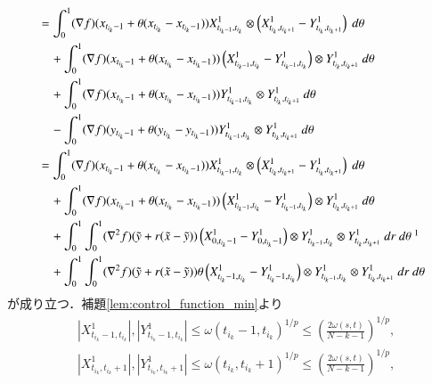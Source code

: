 \begin{prf}
\begin{description}
\begin{align}
					&= \int_0^1 (\nabla f)( x_{t_{i_k}-1}+\theta ( x_{t_{i_k}}-x_{t_{i_k}-1} ))
						X^1_{t_{i_k-1},t_{i_k}} \otimes \left( X^1_{t_{i_k},t_{i_k+1}} - Y^1_{t_{i_k},t_{i_k+1}} \right)\ d\theta \\
						&\quad + \int_0^1 (\nabla f)( x_{t_{i_k}-1}+\theta ( x_{t_{i_k}}-x_{t_{i_k}-1} ))
						\left( X^1_{t_{i_k-1},t_{i_k}} - Y^1_{t_{i_k-1},t_{i_k}} \right) \otimes Y^1_{t_{i_k},t_{i_k+1}}\ d\theta \\
						&\quad + \int_0^1 (\nabla f)( x_{t_{i_k}-1}+\theta ( x_{t_{i_k}}-x_{t_{i_k}-1} ))
						Y^1_{t_{i_k-1},t_{i_k}} \otimes Y^1_{t_{i_k},t_{i_k+1}}\ d\theta \\
						&\quad - \int_0^1 (\nabla f)( y_{t_{i_k}-1}+\theta ( y_{t_{i_k}}-y_{t_{i_k}-1} ))
						Y^1_{t_{i_k-1},t_{i_k}} \otimes Y^1_{t_{i_k},t_{i_k+1}}\ d\theta \\
					&= \int_0^1 (\nabla f)( x_{t_{i_k}-1}+\theta ( x_{t_{i_k}}-x_{t_{i_k}-1} ))
						X^1_{t_{i_k-1},t_{i_k}} \otimes \left( X^1_{t_{i_k},t_{i_k+1}} - Y^1_{t_{i_k},t_{i_k+1}} \right)\ d\theta \\
						&\quad + \int_0^1 (\nabla f)( x_{t_{i_k}-1}+\theta ( x_{t_{i_k}}-x_{t_{i_k}-1} ))
						\left( X^1_{t_{i_k-1},t_{i_k}} - Y^1_{t_{i_k-1},t_{i_k}} \right) \otimes Y^1_{t_{i_k},t_{i_k+1}}\ d\theta \\
						&\quad + \int_0^1 \int_0^1 (\nabla^2 f)( \tilde{y} + r(\tilde{x} - \tilde{y})) 
						\left( X^1_{0,t_{i_k}-1} - Y^1_{0,t_{i_k}-1} \right) \otimes Y^1_{t_{i_k-1},t_{i_k}} \otimes Y^1_{t_{i_k},t_{i_k+1}}\ dr\ d\theta\ \footnotemark \\
						&\quad + \int_0^1 \int_0^1 (\nabla^2 f)( \tilde{y} + r(\tilde{x} - \tilde{y})) 
						\theta \left( X^1_{t_{i_k}-1,t_{i_k}} - Y^1_{t_{i_k}-1,t_{i_k}} \right) \otimes Y^1_{t_{i_k-1},t_{i_k}} \otimes Y^1_{t_{i_k},t_{i_k+1}}\ dr\ d\theta
				\end{align}
				が成り立つ．補題\ref{lem:control_function_min}より
				\begin{align}
					&\left| X^1_{t_{i_k}-1,t_{i_k}} \right|, \left| Y^1_{t_{i_k}-1,t_{i_k}} \right| \leq \omega(t_{i_k}-1,t_{i_k})^{1/p} \leq \left( \frac{2\omega(s,t)}{N-k-1} \right)^{1/p}, \\
					&\left| X^1_{t_{i_k},t_{i_k}+1} \right|, \left| Y^1_{t_{i_k},t_{i_k}+1} \right| \leq \omega(t_{i_k},t_{i_k}+1)^{1/p} \leq \left( \frac{2\omega(s,t)}{N-k-1} \right)^{1/p}, \\

\end{align}
\end{description}
\end{prf}

